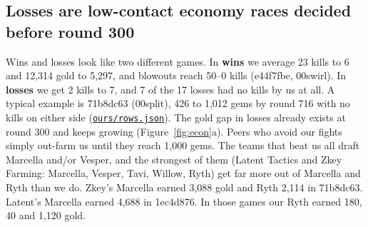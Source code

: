 \documentclass[11pt,a4paper]{article}
\newcommand{\scratch}{file:///private/tmp/claude-501/-Users-tristanbasri-Desktop-Code-cambridge-battlecode-s2/b3f4cb6b-e46a-405f-957c-42c44c05c8dc/scratchpad/ladder-data}
\newcommand{\src}[2]{{\small(\href{#1}{\textcolor{cTop}{\texttt{#2}}})}}
\begin{document}
\subsection{Losses are low-contact economy races decided before round 300}

Wins and losses look like two different games. In \textbf{wins} we average 23 kills to 6 and 12,314 gold to 5,297, and blowouts reach 50--0 kills (e44f7fbe, 00swirl). In \textbf{losses} we get 2 kills to 7, and 7 of the 17 losses had no kills by us at all. A typical example is 71b8dc63 (00split), 426 to 1,012 gems by round 716 with no kills on either side \src{\scratch/ours/rows.json}{ours/rows.json}. The gold gap in losses already exists at round 300 and keeps growing (Figure~\ref{fig:econ}a). Peers who avoid our fights simply out-farm us until they reach 1,000 gems. The teams that beat us all draft Marcella and/or Vesper, and the strongest of them (Latent Tactics and Zkey Farming: Marcella, Vesper, Tavi, Willow, Ryth) get far more out of Marcella and Ryth than we do. Zkey's Marcella earned 3,088 gold and Ryth 2,114 in 71b8dc63. Latent's Marcella earned 4,688 in 1ec4d876. In those games our Ryth earned 180, 40 and 1,120 gold.
\end{document}
